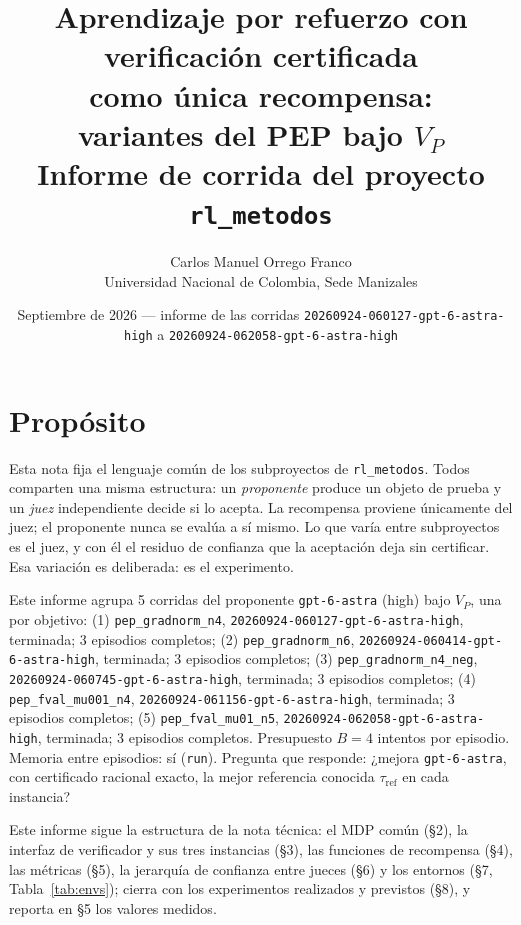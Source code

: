 \documentclass[11pt,a4paper]{article}
\title{Aprendizaje por refuerzo con verificación certificada\\como única recompensa:\\variantes del PEP bajo $V_P$\\[0.4em]\large Informe de corrida del proyecto \texttt{rl\_metodos}}
\author{Carlos Manuel Orrego Franco\\Universidad Nacional de Colombia, Sede Manizales}
\date{Septiembre de 2026 --- informe de las corridas \texttt{20260924-\allowbreak{}060127-\allowbreak{}gpt-\allowbreak{}6-\allowbreak{}astra-\allowbreak{}high} a \texttt{20260924-\allowbreak{}062058-\allowbreak{}gpt-\allowbreak{}6-\allowbreak{}astra-\allowbreak{}high}}
\begin{document}
\maketitle

\section{Propósito}

Esta nota fija el lenguaje común de los subproyectos de \texttt{rl\_metodos}. Todos comparten una misma estructura: un \emph{proponente} produce un objeto de prueba y un \emph{juez} independiente decide si lo acepta. La recompensa proviene únicamente del juez; el proponente nunca se evalúa a sí mismo. Lo que varía entre subproyectos es el juez, y con él el residuo de confianza que la aceptación deja sin certificar. Esa variación es deliberada: es el experimento.

{\sloppy Este informe agrupa 5 corridas del proponente \texttt{gpt-\allowbreak{}6-\allowbreak{}astra} (high) bajo $V_P$, una por objetivo: (1) \texttt{pep\_\allowbreak{}gradnorm\_\allowbreak{}n4}, \texttt{20260924-\allowbreak{}060127-\allowbreak{}gpt-\allowbreak{}6-\allowbreak{}astra-\allowbreak{}high}, terminada; 3 episodios completos; (2) \texttt{pep\_\allowbreak{}gradnorm\_\allowbreak{}n6}, \texttt{20260924-\allowbreak{}060414-\allowbreak{}gpt-\allowbreak{}6-\allowbreak{}astra-\allowbreak{}high}, terminada; 3 episodios completos; (3) \texttt{pep\_\allowbreak{}gradnorm\_\allowbreak{}n4\_\allowbreak{}neg}, \texttt{20260924-\allowbreak{}060745-\allowbreak{}gpt-\allowbreak{}6-\allowbreak{}astra-\allowbreak{}high}, terminada; 3 episodios completos; (4) \texttt{pep\_\allowbreak{}fval\_\allowbreak{}mu001\_\allowbreak{}n4}, \texttt{20260924-\allowbreak{}061156-\allowbreak{}gpt-\allowbreak{}6-\allowbreak{}astra-\allowbreak{}high}, terminada; 3 episodios completos; (5) \texttt{pep\_\allowbreak{}fval\_\allowbreak{}mu01\_\allowbreak{}n5}, \texttt{20260924-\allowbreak{}062058-\allowbreak{}gpt-\allowbreak{}6-\allowbreak{}astra-\allowbreak{}high}, terminada; 3 episodios completos. Presupuesto $B = 4$ intentos por episodio. Memoria entre episodios: sí (\texttt{run}). Pregunta que responde: ¿mejora \texttt{gpt-\allowbreak{}6-\allowbreak{}astra}, con certificado racional exacto, la mejor referencia conocida $\tau_{\mathrm{ref}}$ en cada instancia?\par}

Este informe sigue la estructura de la nota técnica: el MDP común (§2), la interfaz de verificador y sus tres instancias (§3), las funciones de recompensa (§4), las métricas (§5), la jerarquía de confianza entre jueces (§6) y los entornos (§7, Tabla~\ref{tab:envs}); cierra con los experimentos realizados y previstos (§8), y reporta en §5 los valores medidos.
\end{document}
